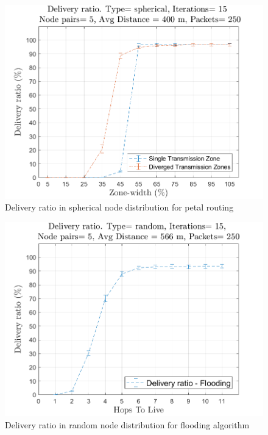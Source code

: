 \begin{figure}[hbtp]
\centering
\includegraphics[width=\simResultFigSize \textwidth]{ncsuthesis-0.6/Chapter-5/figs/pe_DR_spherical.png}
\caption{Delivery ratio in spherical node distribution for petal routing}
\label{fig:pe_DR_spherical}
\end{figure}

\begin{figure}[hbtp]
\centering
\includegraphics[width=\simResultFigSize \textwidth]{ncsuthesis-0.6/Chapter-5/figs/fl_DR_random.png}
\caption{Delivery ratio in random node distribution for flooding algorithm}
\label{fig:fl_DR_random}
\end{figure}


